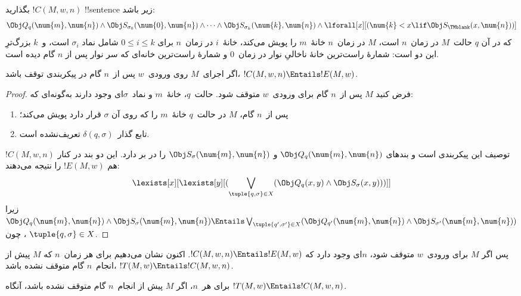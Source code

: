 \documentclass[../../../include/open-logic-section]{subfiles}
\begin{document}
\begin{defn}
بگذارید $!C(M,w,n)$ !!{sentence}ٔ زیر باشد:
\[
\Obj Q_q(\num{m}, \num{n}) \land \Obj S_{\sigma_0}(\num{0}, \num{n})
\land \dots \land \Obj S_{\sigma_k}(\num{k}, \num{n}) \land
\lforall[x][(\num{k} < x \lif \Obj S_\TMblank(x, \num{n}))]
\]
که در آن $q$ حالت~$M$ در زمان~$n$ است، $M$ در زمان~$n$ خانهٔ~$m$ را
پویش می‌کند، خانهٔ~$i$ در زمان~$n$ برای $0\le i\le k$ شامل نماد
$\sigma_i$ است، و~$k$ بزرگ‌ترِ این دو است: شمارهٔ راست‌ترین خانهٔ
ناخالیِ نوار در زمان~$0$ و شمارهٔ راست‌ترین خانه‌ای که سر نوار پس از
$n$ گام دیده است.
\end{defn}

\begin{lem}
اگر اجرای~$M$ روی ورودی~$w$ پس از~$n$ گام در پیکربندی توقف باشد،
$!C(M,w,n)\Entails !E(M,w)$.
\end{lem}

\begin{proof}
فرض کنید $M$ پس از~$n$ گام برای ورودی~$w$ متوقف شود. حالت~$q$،
خانهٔ~$m$ و نماد~$\sigma$ای وجود دارند به‌گونه‌ای که:
\begin{enumerate}
\item پس از~$n$ گام، $M$ در حالت~$q$ خانهٔ~$m$ را که روی آن
  $\sigma$ قرار دارد پویش می‌کند؛
\item تابع گذار~$\delta(q,\sigma)$ تعریف‌نشده است.
\end{enumerate}
$!C(M,w,n)$ توصیف این پیکربندی است و بندهای
$\Obj Q_q(\num{m},\num{n})$ و
$\Obj S_\sigma(\num{m},\num{n})$ را در بر دارد. این دو بند در کنار هم
$!E(M,w)$ را نتیجه می‌دهند:
\[
\lexists[x][\lexists[y][(\bigvee_{\tuple{q, \sigma} \in
      X}(\Obj Q_q(x, y) \land \Obj S_\sigma(x, y)))]]
\]
زیرا
$\Obj Q_q(\num{m},\num{n})\land\Obj S_\sigma(\num{m},\num{n})
\Entails \bigvee_{\tuple{q',\sigma'}\in X}
(\Obj Q_{q'}(\num{m},\num{n})\land
\Obj S_{\sigma'}(\num{m},\num{n}))$، چون
$\tuple{q,\sigma}\in X$.
\end{proof}

\begin{explain}
پس اگر $M$ برای ورودی~$w$ متوقف شود، $n$ای وجود دارد که
$!C(M,w,n)\Entails !E(M,w)$. اکنون نشان می‌دهیم برای هر زمان~$n$ که
$M$ پیش از انجام~$n$ گام متوقف نشده باشد،
$!T(M,w)\Entails !C(M,w,n)$.
\end{explain}

\begin{lem}
برای هر~$n$، اگر $M$ پیش از انجام~$n$ گام متوقف نشده باشد، آنگاه
$!T(M,w)\Entails !C(M,w,n)$.
\end{lem}
\end{document}
